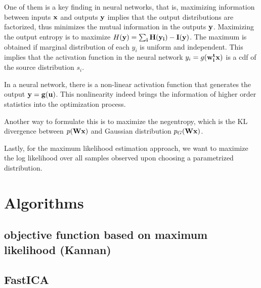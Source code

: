 \documentclass[aps,prl,preprint,superscriptaddress]{revtex4-2}
\begin{document}
One of them is a key finding in neural networks, that is, maximizing information between inputs $\bf{x}$ and outputs $\bf{y}$ implies that the output distributions are factorized, thus minimizes the mutual information in the outputs $\bf{y}$. Maximizing the output entropy is to maximize $H(\bf{y}) = \sum_{i}H(y_{i}) - I(\bf{y})$. The maximum is obtained if marginal distribution of each $y_{i}$ is uniform and independent. This implies that the activation function in the neural network $y_{i} = g(\bf{w}_{i}^{t}\bf{x})$ is a cdf of the source distribution $s_{i}$. 

In a neural network, there is a non-linear activation function that generates the output $\bf{y} = g(\bf{u})$. This nonlinearity indeed brings the information of higher order statistics into the optimization process. 

Another way to formulate this is to maximize the negentropy, which is the KL divergence between $p(\bf{W}\bf{x})$ and Gaussian distribution $p_{G}(\bf{W}\bf{x})$.  

Lastly, for the maximum likelihood estimation approach, we want to maximize the log likelihood over all samples observed upon choosing a parametrized distribution.   


\section{Algorithms}
\subsection{objective function based on maximum likelihood  (Kannan)}

\subsection{FastICA}
\end{document}

